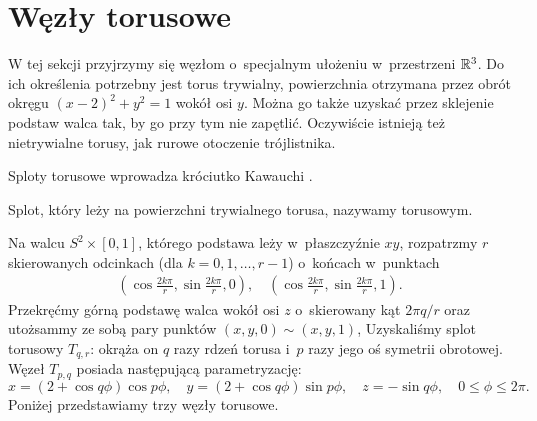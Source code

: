 
\section{Węzły torusowe}
%

W tej sekcji przyjrzymy się węzłom o~specjalnym ułożeniu w~przestrzeni $\mathbb R^3$.
Do ich określenia potrzebny jest torus trywialny, powierzchnia otrzymana przez obrót okręgu $(x-2)^2 + y^2 = 1$ wokół osi $y$.
Można go także uzyskać przez sklejenie podstaw walca tak, by go przy tym nie zapętlić.
Oczywiście istnieją też nietrywialne torusy, jak rurowe otoczenie trójlistnika.

Sploty torusowe wprowadza króciutko Kawauchi \cite[s. 26-27]{kawauchi1996}.

\begin{definition}
    Splot, który leży na powierzchni trywialnego torusa, nazywamy torusowym.
\end{definition}

Na walcu $S^2 \times [0,1]$, którego podstawa leży w~płaszczyźnie $xy$, rozpatrzmy $r$ skierowanych odcinkach (dla $k = 0, 1, \ldots, r - 1$) o~końcach w~punktach
\begin{align*}
    \left(\cos \frac{2k \pi}{r}, \sin \frac{2k\pi}{r}, 0 \right), \quad
    \left(\cos \frac{2k \pi}{r}, \sin \frac{2k\pi}{r}, 1 \right).
\end{align*}
Przekręćmy górną podstawę walca wokół osi $z$ o~skierowany kąt $2\pi q / r$ oraz utożsammy ze sobą pary punktów $(x, y, 0) \sim (x, y, 1)$,
Uzyskaliśmy splot torusowy $T_{q, r}$: okrąża on $q$ razy rdzeń torusa i~$p$ razy jego oś symetrii obrotowej.
Węzeł $T_{p, q}$ posiada następującą parametryzację:
\[
    x = (2+\cos q \phi) \cos p \phi, \quad
    y = (2+\cos q \phi) \sin p \phi, \quad
    z = - \sin q \phi, \quad
    0 \le \phi \le 2\pi.
\]
Poniżej przedstawiamy trzy węzły torusowe.

